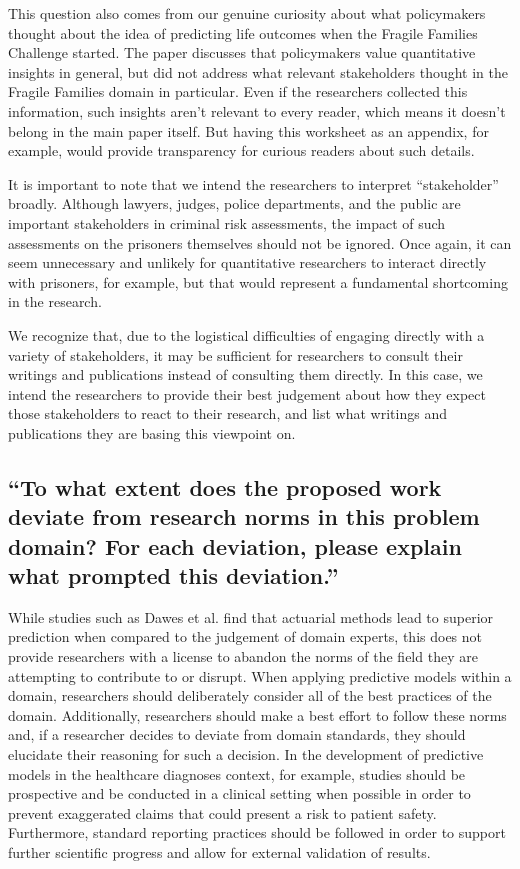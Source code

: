 \documentclass[12pt]{article}
\begin{document}
        This question also comes from our genuine curiosity about what policymakers thought about the idea of predicting life outcomes when the Fragile Families Challenge started. The paper discusses that policymakers value quantitative insights in general, but did not address what relevant stakeholders thought in the Fragile Families domain in particular. Even if the researchers collected this information, such insights aren't relevant to every reader, which means it doesn't belong in the main paper itself. But having this worksheet as an appendix, for example, would provide transparency for curious readers about such details.

        It is important to note that we intend the researchers to interpret ``stakeholder'' broadly. Although lawyers, judges, police departments, and the public are important stakeholders in criminal risk assessments, the impact of such assessments on the prisoners themselves should not be ignored. Once again, it can seem unnecessary and unlikely for quantitative researchers to interact directly with prisoners, for example, but that would represent a fundamental shortcoming in the research. 

        We recognize that, due to the logistical difficulties of engaging directly with a variety of stakeholders, it may be sufficient for researchers to consult their writings and publications instead of consulting them directly. In this case, we intend the researchers to provide their best judgement about how they expect those stakeholders to react to their research, and list what writings and publications they are basing this viewpoint on.

    \subsection{``To what extent does the proposed work deviate from research norms in this problem domain? For each deviation, please explain what prompted this deviation.''}

        While studies such as Dawes et al. \cite{actuarial} find that actuarial methods lead to superior prediction when compared to the judgement of domain experts, this does not provide researchers with a license to abandon the norms of the field they are attempting to contribute to or disrupt. When applying predictive models within a domain, researchers should deliberately consider all of the best practices of the domain. Additionally, researchers should make a best effort to follow these norms and, if a researcher decides to deviate from domain standards, they should elucidate their reasoning for such a decision. In the development of predictive models in the healthcare diagnoses context, for example, studies should be prospective and be conducted in a clinical setting when possible in order to prevent exaggerated claims that could present a risk to patient safety. Furthermore, standard reporting practices should be followed in order to support further scientific progress and allow for external validation of results.
\end{document}
